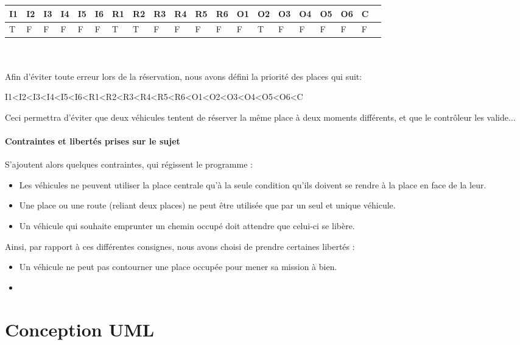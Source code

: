 \documentclass[a4paper, titlepage]{report}
\begin{document}
\begin{tabular}{|l|l|l|l|l|l|l|l|l|l|l|l|l|l|l|l|l|l|l|l|}

\hline
  I1 & I2 & I3 & I4 & I5 & I6 & R1 & R2 & R3 & R4 & R5 & R6 & O1 & O2 & O3 & O4 & O5 & O6 & C \\
  \hline
   T & F & F & F & F & F & T & T & F & F & F & F & F & T & F & F & F & F & F\\
 \hline

\end{tabular}\\
\vspace{0.25cm}\\
Afin d'éviter toute erreur lors de la réservation, nous avons défini la priorité des places qui suit:
\begin{center}
I1<I2<I3<I4<I5<I6<R1<R2<R3<R4<R5<R6<O1<O2<O3<O4<O5<O6<C
\end{center}
Ceci permettra d'éviter que deux véhicules tentent de réserver la même place à deux moments différents, et que le contrôleur les valide...

\subsection{Contraintes et libertés prises sur le sujet}


S'ajoutent alors quelques contraintes, qui régissent le programme :
\begin{itemize}
  \item Les véhicules ne peuvent utiliser la place centrale qu'à la seule condition qu'ils doivent se rendre à la place en face de la leur.
  \item Une place ou une route (reliant deux places) ne peut être utilisée que par un seul et unique véhicule.
  \item Un véhicule qui souhaite emprunter un chemin occupé doit attendre que celui-ci se libère.
\end{itemize}
\vspace{0.25cm}
Ainsi, par rapport à ces différentes consignes, nous avons choisi de prendre certaines libertés :
\vspace{0.25cm}
\begin{itemize}
  \item Un véhicule ne peut pas contourner une place occupée pour mener sa mission à bien.
  \item 
\end{itemize}
\part{Conception UML}
\end{document}
